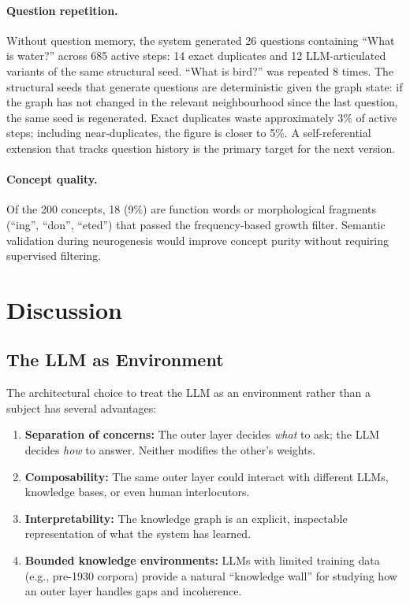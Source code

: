 \documentclass[conference]{IEEEtran}
\begin{document}
\paragraph{Question repetition.} Without question memory, the system generated 26 questions containing ``What is water?'' across 685 active steps: 14 exact duplicates and 12 LLM-articulated variants of the same structural seed. ``What is bird?'' was repeated 8 times. The structural seeds that generate questions are deterministic given the graph state: if the graph has not changed in the relevant neighbourhood since the last question, the same seed is regenerated. Exact duplicates waste approximately 3\% of active steps; including near-duplicates, the figure is closer to 5\%. A self-referential extension that tracks question history is the primary target for the next version.

\paragraph{Concept quality.} Of the 200 concepts, 18 (9\%) are function words or morphological fragments (``ing'', ``don'', ``eted'') that passed the frequency-based growth filter. Semantic validation during neurogenesis would improve concept purity without requiring supervised filtering.


\section{Discussion}
\label{sec:discussion}

\subsection{The LLM as Environment}

The architectural choice to treat the LLM as an environment rather than a subject has several advantages:

\begin{enumerate}[leftmargin=*]
\item \textbf{Separation of concerns:} The outer layer decides \emph{what} to ask; the LLM decides \emph{how} to answer. Neither modifies the other's weights.
\item \textbf{Composability:} The same outer layer could interact with different LLMs, knowledge bases, or even human interlocutors.
\item \textbf{Interpretability:} The knowledge graph is an explicit, inspectable representation of what the system has learned.
\item \textbf{Bounded knowledge environments:} LLMs with limited training data (e.g., pre-1930 corpora) provide a natural ``knowledge wall'' for studying how an outer layer handles gaps and incoherence.
\end{enumerate}
\end{document}
